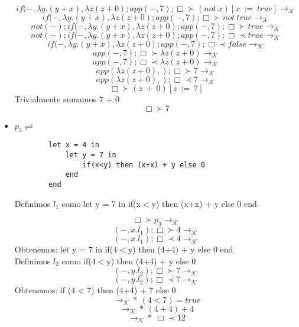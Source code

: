 \documentclass[11pt, a4paper]{report}
\begin{document}
\begin{itemize}
		$$ if(-,\lambda y.(y+x),\lambda z(z+0);app(-,7); \Box \succ (not\ x)[x\ :=\ true]  \rightarrow_{\mathcal{K}} $$
		$$ if(-,\lambda y.(y+x),\lambda z(z+0);app(-,7); \Box \succ not\ true \rightarrow_{\mathcal{K}} $$
		$$ not(-);if(-,\lambda y.(y+x),\lambda z(z+0);app(-,7); \Box \succ true \rightarrow_{\mathcal{K}} $$
		$$ not(-);if(-,\lambda y.(y+x),\lambda z(z+0);app(-,7); \Box \prec true \rightarrow_{\mathcal{K}} $$		
		$$ if(-,\lambda y.(y+x),\lambda z(z+0);app(-,7); \Box \prec false \rightarrow_{\mathcal{K}} $$
		$$ app(-,7); \Box \succ \lambda z(z+0) \rightarrow_{\mathcal{K}} $$
		$$ app(-,7); \Box \prec \lambda z(z+0) \rightarrow_{\mathcal{K}} $$
		$$ app(\lambda z(z+0),); \Box \succ 7 \rightarrow_{\mathcal{K}} $$
		$$ app(\lambda z(z+0),); \Box \prec 7 \rightarrow_{\mathcal{K}} $$
		$$ \Box \succ (z\ + \ 0)[z\ :=\ 7] $$
		Trivialmente sumamos 7 + 0
		$$ \Box \succ 7  $$
		\item $p_{3} \rightleftharpoons$
		\begin{lstlisting}
		let x = 4 in 
			let y = 7 in
				if(x<y) then (x+x) + y else 0
			end
		end
		\end{lstlisting}
		Definimos $l_{1}$ como let y = 7 in if(x$<$y) then (x+x) + y else 0	end
		
		$$ \Box \succ p_{3} \rightarrow_{\mathcal{K}}$$
		$$ (-,x.l_{1});\Box \succ 4 \rightarrow_{\mathcal{K}} $$
		$$ (-,x.l_{1});\Box \prec 4 \rightarrow_{\mathcal{K}} $$
		Obtenemos: let y = 7 in if(4$<$y) then (4+4) + y else 0	end\\
		Definimos $l_{2}$ como if(4$<$y) then (4+4) + y else 0
		$$ (-,y.l_{2});\Box \succ 7 \rightarrow_{\mathcal{K}} $$
		$$ (-,y.l_{2});\Box \prec 7 \rightarrow_{\mathcal{K}} $$
		Obtenemos: if (4 < 7) then (4+4) + 7 else 0
		$$ \rightarrow_{\mathcal{K}}*\ (4 < 7)=true $$
		$$ \rightarrow_{\mathcal{K}}*\ (4+4)+4 $$
		$$ \rightarrow_{\mathcal{K}}*\ \Box \prec 12 $$
	\end{itemize}
\end{document}
